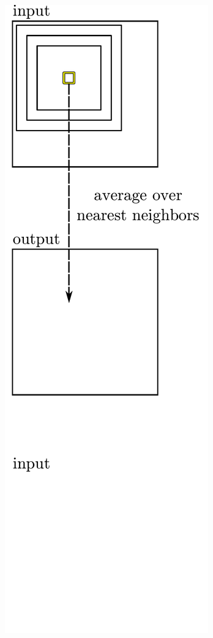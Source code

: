 \documentclass{article} %
\begin{document}
\begin{figure}[t]
\centering
\renewcommand{\tabcolsep}{2pt}
\hspace{-2em}
\begin{minipage}[t]{0.23\linewidth}
\vspace{0pt}
\centering
\includegraphics[width=\textwidth]{figures/patch_replacement.pdf}

\end{minipage}
\end{figure}
\end{document}
